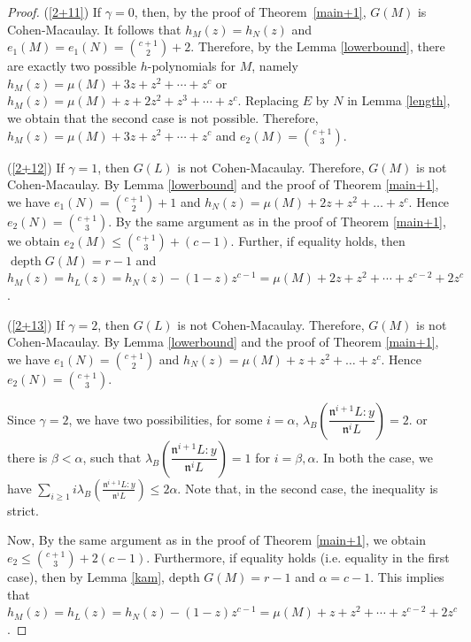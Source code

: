 \documentclass[10pt,a4paper]{amsart}
\newcommand{\depth}{\operatorname{depth}}
\newcommand{\n}{\mathfrak{n}}
\begin{document}
\begin{proof}
   (\ref{2+11}) If $\gamma=0$, then, by the proof of Theorem~\ref{main+1}, $G(M)$ is Cohen-Macaulay. It follows that $h_M(z)=h_N(z)$ and $ e_1(M)=e_1(N)=\binom{c+1}{2}+2$. Therefore, by the Lemma \ref{lowerbound}, there are exactly two possible $h$-polynomials for $M$, namely $h_M(z)=\mu(M)+3z+z^2+\cdots+z^c$ or $h_M(z)=\mu(M)+z+2z^2+z^3+\cdots+z^c$. Replacing $E$ by $N$ in Lemma \ref{length}, we obtain that the second case is not possible. Therefore, $h_M(z)=\mu(M)+3z+z^2+\cdots+z^c$ and $ e_2(M)=\binom{c+1}{3}$.

\noindent
   (\ref{2+12})  If $\gamma=1$, then $G(L)$ is not Cohen-Macaulay. Therefore, $G(M)$ is not Cohen-Macaulay. By Lemma \ref{lowerbound} and the proof of Theorem \ref{main+1}, we have $ e_1(N)=\binom{c+1}{2}+1$ and $h_N(z)=\mu(M)+2z+z^2+\ldots+ z^{c}.$ Hence $ e_2(N)=\binom{c+1}{3}$. By the same argument as in the proof of Theorem \ref{main+1}, we obtain $  e_2(M)\leq \binom{c+1}{3}+(c-1)$. Further, if equality holds, then $\depth G(M)= r-1$ and $h_M(z)=h_L(z)=h_N(z)-(1-z)z^{c-1}
=\mu(M)+2z+z^2+\cdots+z^{c-2}+2z^c$.

\noindent
(\ref{2+13}) If $\gamma =2$, then $G(L)$ is not Cohen-Macaulay. Therefore, $G(M)$ is not Cohen-Macaulay. By Lemma \ref{lowerbound} and the proof of Theorem \ref{main+1}, we have $ e_1(N)=\binom{c+1}{2}$ and $h_N(z)=\mu(M)+z+z^2+\ldots+ z^{c}.$ Hence $ e_2(N)=\binom{c+1}{3}$. 

Since $\gamma=2$, we have two possibilities,  for some $i=\alpha$, $\lambda_B \left(\dfrac{\n^{i+1}L:y}{\n^iL}\right)=2.$ or there is $\beta < \alpha$, such that  $\lambda_B \left(\dfrac{\n^{i+1}L:y}{\n^iL}\right)=1$ for $i=\beta ,\alpha$. In both the case,  we have $\displaystyle  \sum_{i\geq 1}i\lambda_B\left(\frac{{\n}^{i+1}L:y}{{\n}^iL}\right)\leq 2\alpha$. Note that, in the second case, the inequality is strict.

Now, By the same argument as in the proof of Theorem \ref{main+1}, we obtain $ e_2\leq \binom{c+1}{3}+2(c-1)$. Furthermore, if equality holds (i.e. equality in the first case), then by Lemma \ref{kam}, depth $G(M)=r-1$ and $\alpha=c-1.$ This implies that $h_M(z)=h_L(z)=h_N(z)-(1-z)z^{c-1}
=\mu(M)+z+z^2+\cdots+z^{c-2}+2z^c$.
\end{proof}
\end{document}
